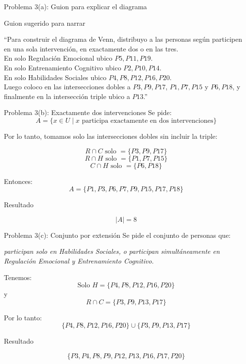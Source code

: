 \documentclass[aspectratio=169,10pt]{beamer}
\newcommand{\Guion}[1]{
	\begin{exampleblock}{Guion sugerido para narrar}
		#1
	\end{exampleblock}
}
\newcommand{\Resultado}[1]{
	\begin{block}{Resultado}
		#1
	\end{block}
}
\begin{document}
	\begin{frame}{Problema 3(a): Guion para explicar el diagrama}
		\Guion{
			``Para construir el diagrama de Venn, distribuyo a las personas según participen en una sola intervención, en exactamente dos o en las tres.\\[0.2cm]
			En solo Regulación Emocional ubico \(P5, P11, P19\).\\
			En solo Entrenamiento Cognitivo ubico \(P2, P10, P14\).\\
			En solo Habilidades Sociales ubico \(P4, P8, P12, P16, P20\).\\
			Luego coloco en las intersecciones dobles a \(P3, P9, P17\), \(P1, P7, P15\) y \(P6, P18\), y finalmente en la intersección triple ubico a \(P13\).''}
	\end{frame}
	
	\begin{frame}{Problema 3(b): Exactamente dos intervenciones}
		Se pide:
		\[
		A=\{x\in U \mid x \text{ participa exactamente en dos intervenciones}\}
		\]
		
		Por lo tanto, tomamos solo las intersecciones dobles sin incluir la triple:
		
		\[
		R\cap C \text{ solo }=\{P3,P9,P17\}
		\]
		\[
		R\cap H \text{ solo }=\{P1,P7,P15\}
		\]
		\[
		C\cap H \text{ solo }=\{P6,P18\}
		\]
		
		Entonces:
		\[
		A=\{P1,P3,P6,P7,P9,P15,P17,P18\}
		\]
		
		\Resultado{
			\[
			|A|=8
			\]
		}
	\end{frame}
	
	\begin{frame}{Problema 3(c): Conjunto por extensión}
		Se pide el conjunto de personas que:
		
		\begin{center}
			\emph{participan solo en Habilidades Sociales, o participan simultáneamente en Regulación Emocional y Entrenamiento Cognitivo.}
		\end{center}
		
		Tenemos:
		\[
		\text{Solo }H=\{P4,P8,P12,P16,P20\}
		\]
		y
		\[
		R\cap C=\{P3,P9,P13,P17\}
		\]
		
		Por lo tanto:
		\[
		\{P4,P8,P12,P16,P20\}\cup\{P3,P9,P13,P17\}
		\]
		
		\Resultado{
			\[
			\{P3,P4,P8,P9,P12,P13,P16,P17,P20\}
			\]
		}
	\end{frame}
	
\end{document}
